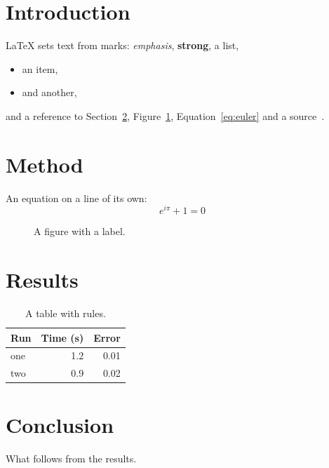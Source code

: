 \documentclass[11pt,{{paper}}]{article}
\title{\doctitle}
\author{\docauthor}
\date{\today}
\begin{document}
\maketitle

\begin{abstract}
  Say in a few sentences what this article shows and why it matters.
\end{abstract}

\section{Introduction}\label{sec:intro}
LaTeX sets text from marks: \emph{emphasis}, \textbf{strong}, a list,
\begin{itemize}
  \item an item,
  \item and another,
\end{itemize}
and a reference to Section~\ref{sec:method}, Figure~\ref{fig:box},
Equation~\eqref{eq:euler} and a source~\cite{knuth84}.

\section{Method}\label{sec:method}
An equation on a line of its own:
\begin{equation}\label{eq:euler}
  e^{i\pi} + 1 = 0
\end{equation}

\begin{figure}[htbp]
  \centering
  \caption{A figure with a label.}
  \label{fig:box}
\end{figure}

\section{Results}
\begin{table}[htbp]
  \centering
  \caption{A table with rules.}
  \label{tab:runs}
  \begin{tabular}{lrr}
    \toprule
    Run & Time (s) & Error \\
    \midrule
    one & 1.2 & 0.01 \\
    two & 0.9 & 0.02 \\
    \bottomrule
  \end{tabular}
\end{table}

\section{Conclusion}
What follows from the results.



\end{document}
